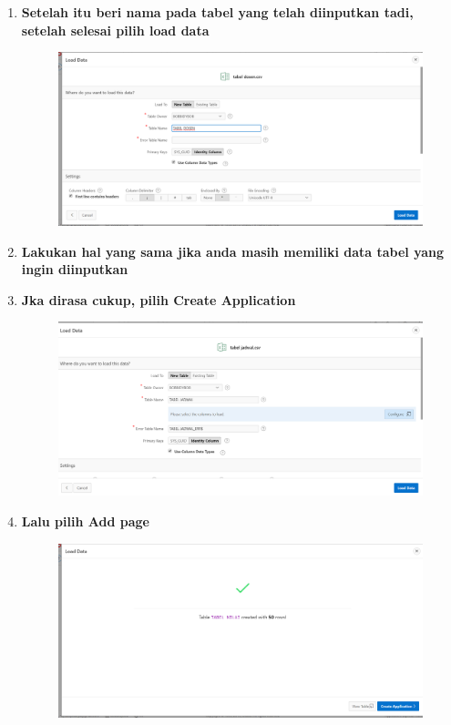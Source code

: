 \begin{enumerate}
\item \textbf{Setelah itu beri nama pada tabel yang telah diinputkan tadi, setelah selesai pilih load data}
\begin{figure}[H]
    \centering
    \includegraphics[scale=0.3]{figures/15.png}
    \label{13}
\end{figure}


\item \textbf{Lakukan hal yang sama jika anda masih memiliki data tabel yang ingin diinputkan}

\item \textbf{Jka dirasa cukup, pilih Create Application}
\begin{figure}[H]
    \centering
    \includegraphics[scale=0.3]{figures/16.png}
    \label{14}
\end{figure}


\item \textbf{Lalu pilih Add page}
\begin{figure}[H]
    \centering
    \includegraphics[scale=0.3]{figures/17.png}
    \label{15}
\end{figure}

\end{enumerate}

